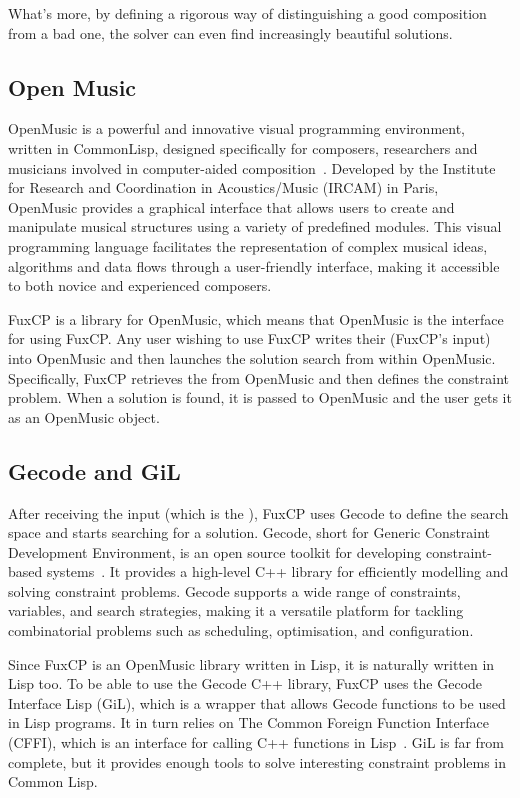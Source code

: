 What's more, by defining a rigorous way of distinguishing a good composition from a bad one, the solver can even find increasingly beautiful solutions.

\subsection{Open Music}
OpenMusic is a powerful and innovative visual programming environment, written in CommonLisp, designed specifically for composers, researchers and musicians involved in computer-aided composition~\cite{OpenMusic}. Developed by the Institute for Research and Coordination in Acoustics/Music (IRCAM) in Paris, OpenMusic provides a graphical interface that allows users to create and manipulate musical structures using a variety of predefined modules. This visual programming language facilitates the representation of complex musical ideas, algorithms and data flows through a user-friendly interface, making it accessible to both novice and experienced composers. 


FuxCP is a library for OpenMusic, which means that OpenMusic is the interface for using FuxCP. Any user wishing to use FuxCP writes their \cfs (FuxCP's input) into OpenMusic and then launches the solution search from within OpenMusic. Specifically, FuxCP retrieves the \cfs from OpenMusic and then defines the constraint problem. When a solution is found, it is passed to OpenMusic and the user gets it as an OpenMusic object.

\subsection{Gecode and GiL}
After receiving the input (which is the \cf), FuxCP uses Gecode to define the search space and starts searching for a solution. Gecode, short for Generic Constraint Development Environment, is an open source toolkit for developing constraint-based systems~\cite{Gecode}. It provides a high-level C++ library for efficiently modelling and solving constraint problems. Gecode supports a wide range of constraints, variables, and search strategies, making it a versatile platform for tackling combinatorial problems such as scheduling, optimisation, and configuration. 


Since FuxCP is an OpenMusic library written in Lisp, it is naturally written in Lisp too. To be able to use the Gecode C++ library, FuxCP uses the Gecode Interface Lisp (GiL), which is a wrapper that allows Gecode functions to be used in Lisp programs. It in turn relies on The Common Foreign Function Interface (CFFI), which is an interface for calling C++ functions in Lisp~\cite{CFFI}.  GiL is far from complete, but it provides enough tools to solve interesting constraint problems in Common Lisp.

